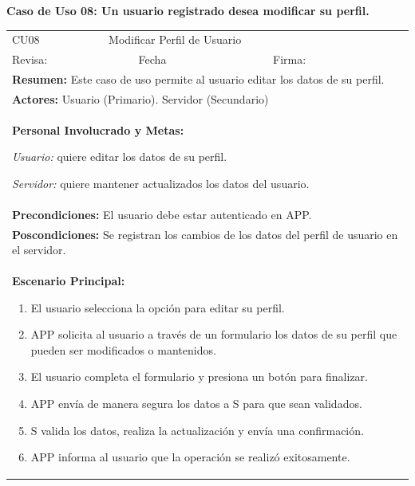 		\textbf{Caso de Uso 08: Un usuario registrado desea modificar su perfil.}
			\begin{longtable}{|l|p{5.5cm}|l|p{2cm}|l|p{1.9cm}|} \hline
				\cellcolor{grisOscuro} CU08 & \multicolumn{4}{|l|}{  \cellcolor{grisOscuro} Modificar Perfil de Usuario} &  \cellcolor{grisClaro}\multirow{2}{1cm}{} \\ \cline{1-5}
				\cellcolor{grisOscuro} Revisa: &  \cellcolor{grisClaro} &  \cellcolor{grisOscuro} Fecha &  \cellcolor{grisClaro} &  \cellcolor{grisOscuro} Firma: & \cellcolor{grisClaro} \\ \hline
				\multicolumn{6}{|p{15cm}|}{ \textbf{Resumen: } Este caso de uso permite al usuario editar los datos de su perfil.

				} \\ \hline

				\multicolumn{6}{|p{15cm}|}{ \textbf{Actores: } Usuario (Primario). Servidor (Secundario)

				} \\ \hline

				\multicolumn{6}{|p{15cm}|}{ \textbf{Personal Involucrado y Metas: }
				
				\emph{Usuario:} quiere editar los datos de su perfil.

				\emph{Servidor:} quiere mantener actualizados los datos del usuario.

				} \\ \hline

				\multicolumn{6}{|p{15cm}|}{ \textbf{Precondiciones: } El usuario debe estar autenticado en APP.

				} \\ \hline

				\multicolumn{6}{|p{15cm}|}{ \textbf{Poscondiciones: } Se registran los cambios de los datos del perfil de usuario en el servidor.

				} \\ \hline

				\multicolumn{6}{|p{15cm}|}{ \textbf{Escenario Principal: }

				\begin{enumerate}
					\item El usuario selecciona la opción para editar su perfil.
					\item APP solicita al usuario a través de un formulario los datos de su perfil que pueden ser modificados o mantenidos.
					\item El usuario completa el formulario y presiona un botón para finalizar.
					\item APP envía de manera segura los datos a S para que sean validados.
					\item S valida los datos, realiza la actualización y envía una confirmación.
					\item APP informa al usuario que la operación se realizó exitosamente.
				\end{enumerate}

}
\end{longtable}

